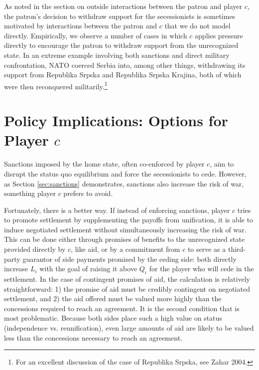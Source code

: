 \documentclass[11pt,letterpaper, notitlepage]{article}
\begin{document}
As noted in the section on outside interactions between the patron and player $c$, the patron's decision to withdraw support for the secessionists is sometimes motivated by interactions between the patron and $c$ that we do not model directly. Empirically, we observe a number of cases in which $c$ applies pressure directly to encourage the patron to withdraw support from the unrecognized state. In an extreme example involving both sanctions and direct military confrontation, NATO coerced Serbia into, among other things, withdrawing its support from Republika Srpska and Republika Srpska Krajina, both of which were then reconquered militarily.\footnote{For an excellent discussion of the case of Republika Srpska, see Zahar 2004.} %

\section{Policy Implications: Options for Player \texorpdfstring{$c$}{c}}

Sanctions imposed by the home state, often co-enforced by player $c$, aim to disrupt the status quo equilibrium and force the secessionists to cede. However, as Section \ref{sec:sanctions} demonstrates, sanctions also increase the risk of war, something player $c$ prefers to avoid. 

Fortunately, there is a better way. If instead of enforcing sanctions, player $c$ tries to promote settlement by supplementing the payoffs from unification, it is able to induce negotiated settlement without simultaneously increasing the risk of war. This can be done either through promises of benefits to the unrecognized state provided directly by $c$, like aid, or by a commitment from $c$ to serve as a third-party guarantor of side payments promised by the ceding side: both directly increase $L_i$ with the goal of raising it above $Q_i$ for the player who will cede in the settlement. In the case of contingent promises of aid, the calculation is relatively straightforward: 1) the promise of aid must be credibly contingent on negotiated settlement, and 2) the aid offered must be valued more highly than the concessions required to reach an agreement. It is the second condition that is most problematic. Because both sides place such a high value on status (independence vs. reunification), even large amounts of aid are likely to be valued less than the concessions necessary to reach an agreement.
\end{document}
